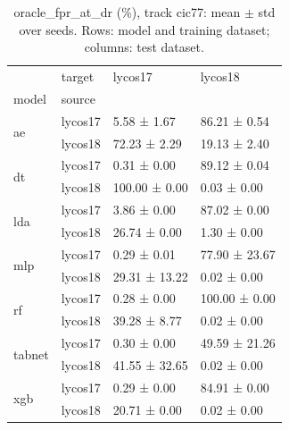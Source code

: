 \begin{table}
\caption{oracle_fpr_at_dr (\%), track cic77: mean $\pm$ std over seeds. Rows: model and training dataset; columns: test dataset.}
\label{tab:matrix_cic77_oracle_fpr_at_dr}
\begin{tabular}{llll}
\toprule
 & target & lycos17 & lycos18 \\
model & source &  &  \\
\midrule
\multirow[t]{2}{*}{ae} & lycos17 & 5.58 ± 1.67 & 86.21 ± 0.54 \\
 & lycos18 & 72.23 ± 2.29 & 19.13 ± 2.40 \\
\cline{1-4}
\multirow[t]{2}{*}{dt} & lycos17 & 0.31 ± 0.00 & 89.12 ± 0.04 \\
 & lycos18 & 100.00 ± 0.00 & 0.03 ± 0.00 \\
\cline{1-4}
\multirow[t]{2}{*}{lda} & lycos17 & 3.86 ± 0.00 & 87.02 ± 0.00 \\
 & lycos18 & 26.74 ± 0.00 & 1.30 ± 0.00 \\
\cline{1-4}
\multirow[t]{2}{*}{mlp} & lycos17 & 0.29 ± 0.01 & 77.90 ± 23.67 \\
 & lycos18 & 29.31 ± 13.22 & 0.02 ± 0.00 \\
\cline{1-4}
\multirow[t]{2}{*}{rf} & lycos17 & 0.28 ± 0.00 & 100.00 ± 0.00 \\
 & lycos18 & 39.28 ± 8.77 & 0.02 ± 0.00 \\
\cline{1-4}
\multirow[t]{2}{*}{tabnet} & lycos17 & 0.30 ± 0.00 & 49.59 ± 21.26 \\
 & lycos18 & 41.55 ± 32.65 & 0.02 ± 0.00 \\
\cline{1-4}
\multirow[t]{2}{*}{xgb} & lycos17 & 0.29 ± 0.00 & 84.91 ± 0.00 \\
 & lycos18 & 20.71 ± 0.00 & 0.02 ± 0.00 \\
\cline{1-4}
\bottomrule
\end{tabular}
\end{table}
